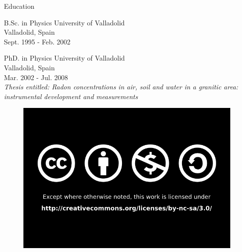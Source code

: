\documentclass[newPxFont,numfooter,sectionpages]{beamer}
\newcommand{\1}{\'{\i}}
\begin{document}
\begingroup
{}

\begin{frame}{Education}

\begin{alertblock}{B.Sc. in Physics}
University of Valladolid \\     Valladolid, Spain \\     Sept. 1995 - Feb. 2002
\end{alertblock}

\begin{alertblock}{PhD. in Physics}
University of Valladolid \\     Valladolid, Spain \\     Mar. 2002 - Jul. 2008 \\ \emph{Thesis entitled: Radon concentrations in air, soil and water in a granitic area: instrumental development \- and measurements}
\end{alertblock}

\end{frame}


\endgroup








%
%
%
%

\begin{frame}

\begin{figure}

\href{http://creativecommons.org/licenses/by-nc-sa/4.0/}{\includegraphics[scale=0.4]{figures/By_nc_sa_bw.png}}

\end{figure}

\end{frame}
\end{document}

